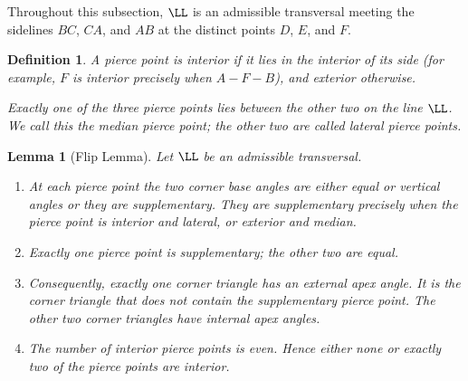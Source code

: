 \documentclass[12pt,a4paper]{amsart}
\newtheorem{lemma}[theorem]{Lemma}
\newtheorem{definition}[theorem]{Definition}
\theoremstyle{remark}
\begin{document}
Throughout this subsection, $\LL$ is an admissible transversal meeting the
sidelines $BC$, $CA$, and $AB$ at the distinct points $D$, $E$, and $F$.

\begin{definition}
A pierce point is \emph{interior} if it lies in the interior of its side
(for example, $F$ is interior precisely when $A-F-B$), and \emph{exterior}
otherwise.

Exactly one of the three pierce points lies between the other two on the line
$\LL$.  We call this the \emph{median pierce point}; the other two are called
\emph{lateral pierce points}.
\end{definition}

\begin{lemma}[Flip Lemma]
\label{lem:flip}
Let $\LL$ be an admissible transversal.

\begin{enumerate}
\item
At each pierce point the two corner base angles are either equal
or vertical angles or they are supplementary.  They are supplementary precisely when the
pierce point is interior and lateral, or exterior and median.

\item
Exactly one pierce point is supplementary; the other two are equal.

\item
Consequently, exactly one corner triangle has an external apex angle.  It is the
corner triangle that does not contain the supplementary pierce point.  The other
two corner triangles have internal apex angles.

\item
The number of interior pierce points is even.  Hence either none or exactly two
of the pierce points are interior.
\end{enumerate}
\end{lemma}
\end{document}
